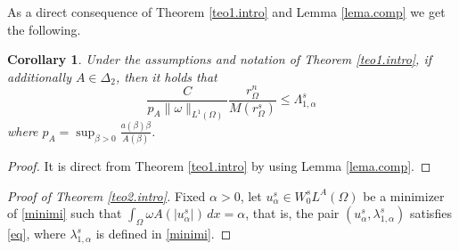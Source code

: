 \documentclass[12pt,reqno]{amsart}
\newtheorem{cor}[thm]{Corollary}
\theoremstyle{definition}
\theoremstyle{remark}
\numberwithin{equation}{section}
\begin{document}
As a direct consequence of  Theorem \ref{teo1.intro} and Lemma \ref{lema.comp} we get the following.
\begin{cor} \label{coro.1}
Under the assumptions and notation of Theorem \ref{teo1.intro}, if additionally $A\in \Delta_2$, then it holds that
$$
\frac{C}{p_A\|\omega\|_{L^1(\Omega)}} \frac{r_\Omega^n}{M( r_\Omega^s)} \le \Lambda_{1,\alpha}^s 
$$
where  $p_A=\sup_{\beta>0} \frac{a(\beta)\beta}{A(\beta)}$.
\end{cor}
\begin{proof}
It is direct from Theorem \ref{teo1.intro} by using  Lemma \ref{lema.comp}.
\end{proof}


 

 
  

\begin{proof}[Proof of Theorem \ref{teo2.intro}]
Fixed $\alpha>0$, let $u_\alpha^s \in W^s_0 L^A(\Omega)$ be a minimizer of \eqref{minimi}  such that $\int_\Omega \omega A(|u_\alpha^s|)\,dx =\alpha$, that is, the pair $(u_\alpha^s, \lambda_{1,\alpha}^s)$ satisfies  \eqref{eq},  where  $\lambda_{1,\alpha}^s$ is defined in \eqref{minimi}. 


\end{proof}
\end{document}
